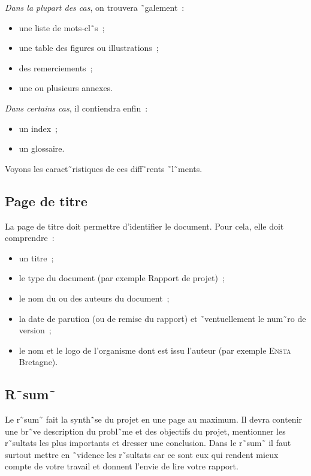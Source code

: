 
\emph{Dans la plupart des cas}, on trouvera  ˜galement~:
\begin{itemize}
\item une liste de mots-cl˜s~;  
\item une table des figures ou illustrations~;
\item des remerciements~;
\item une ou plusieurs annexes.
\end{itemize}

\emph{Dans certains cas}, il contiendra enfin~:
\begin{itemize}
\item un index~;
\item un glossaire.
\end{itemize}

Voyons les caract˜ristiques de ces diff˜rents ˜l˜ments.

\subsection{Page de titre}

La page de titre doit permettre d'identifier le document. Pour cela, elle doit
comprendre~: 
\begin{itemize}
\item un titre~;
\item le type du document (par exemple \og{}Rapport de projet\fg{})~;
\item le nom du ou des auteurs du document~;
\item la date de parution (ou de remise du rapport) et ˜ventuellement le
  num˜ro de version~;
\item le nom et le logo de l'organisme dont est issu l'auteur (par exemple
  \textsc{Ensta} Bretagne).
\end{itemize}

\subsection{R˜sum˜}

Le r˜sum˜ fait la synth˜se du projet en une page au maximum. Il
devra contenir une br˜ve description du probl˜me et des objectifs du projet,
mentionner les r˜sultats les plus
importants et dresser une conclusion. Dans le r˜sum˜ il faut surtout mettre en
˜vidence les r˜sultats car ce sont eux qui rendent mieux compte de votre
travail et donnent l'envie de lire votre rapport. 

